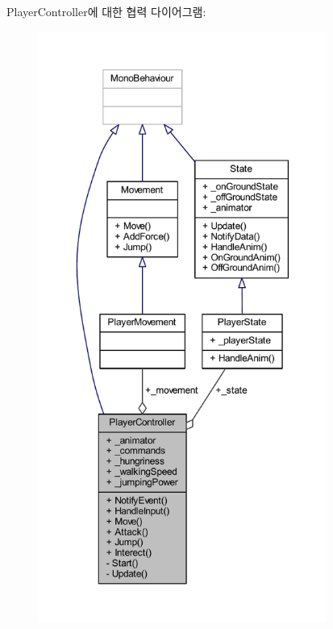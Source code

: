 Player\+Controller에 대한 협력 다이어그램\+:
\nopagebreak
\begin{figure}[H]
\begin{center}
\leavevmode
\includegraphics[height=550pt]{db/de2/class_player_controller__coll__graph}
\end{center}
\end{figure}
